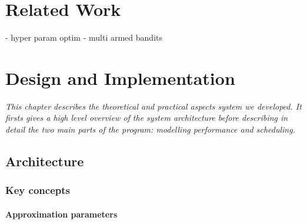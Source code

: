 \documentclass[a4paper,12pt,twoside,openright]{report}
\begin{document}




\chapter{Related Work} 

- hyper param optim
- multi armed bandits











\chapter{Design and Implementation} 



\textit{This chapter describes the theoretical and practical aspects system we developed. It firsts gives a high level overview of the system architecture before describing in detail the two main parts of the program: modelling performance and scheduling.}

\section{Architecture} %
\subsection{Key concepts}
\subsubsection{Approximation parameters}
\end{document}
